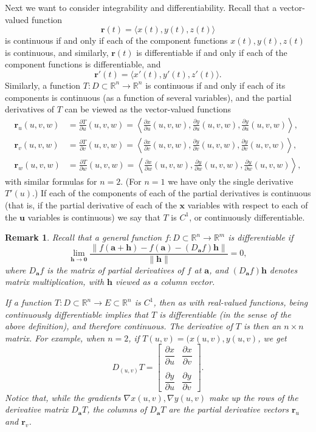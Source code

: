 \documentclass[12pt,letterpaper]{article}
\newtheorem{rem}[theorem]{Remark}
\newenvironment{remark}{\begin{rem}\rm}{\end{rem}}
\newcommand{\R}{\mathbb{R}}
\newcommand{\x}{\mathbf{x}}
\newcommand{\uu}{\mathbf{u}}
\newcommand{\h}{\mathbf{h}}
\newcommand{\aaa}{\mathbf{a}}
\renewcommand{\r}{\mathbf{r}}
\begin{document}
Next we want to consider integrability and differentiability. Recall that a vector-valued function
\[
\r(t) = \langle x(t),y(t),z(t)\rangle
\]
is continuous if and only if each of the component functions $x(t), y(t), z(t)$ is continuous, and similarly, $\r(t)$ is differentiable if and only if each of the component functions is differentiable, and 
\[
\r'(t) = \langle x'(t), y'(t), z'(t)\rangle.
\]
Similarly, a function $T:D\subset \R^n \to \R^n$ is continuous if and only if each of its components is continuous (as a function of several variables), and the partial derivatives of $T$ can be viewed as the vector-valued functions
\begin{align*}
\r_u(u,v,w) &= \frac{\partial T}{\partial u}(u,v,w) = \left<\frac{\partial x}{\partial u}(u,v,w),\frac{\partial y}{\partial u}(u,v,w),\frac{\partial y}{\partial u}(u,v,w)\right>,\\
\r_v(u,v,w) &= \frac{\partial T}{\partial v}(u,v,w) = \left<\frac{\partial x}{\partial v}(u,v,w),\frac{\partial y}{\partial v}(u,v,w),\frac{\partial y}{\partial v}(u,v,w)\right>,\\
\r_w(u,v,w) &= \frac{\partial T}{\partial w}(u,v,w) = \left<\frac{\partial x}{\partial w}(u,v,w),\frac{\partial y}{\partial w}(u,v,w),\frac{\partial y}{\partial w}(u,v,w)\right>,
\end{align*}
with similar formulas for $n=2$. (For $n=1$ we have only the single derivative $T'(u)$.) If each of the components of each of the partial derivatives is continuous (that is, if the partial derivative of each of the $\x$ variables with respect to each of the $\uu$ variables is continuous) we say that $T$ is $C^1$, or continuously differentiable.
\begin{remark}
Recall that a general function $f:D\subset \R^n\to\R^m$ is {\em differentiable} if
\[
\lim_{\h\to\mathbf{0}}\frac{\lVert f(\aaa+\h)-f(\aaa)-(D_\aaa f)\h\rVert}{\lVert\h\rVert}=0,
\]
where $D_\aaa f$ is the matrix of partial derivatives of $f$ at $\aaa$, and $(D_\aaa f)\h$ denotes matrix multiplication, with $\h$ viewed as a column vector. 

If a function $T:D\subset\R^n\to E\subset \R^n$ is $C^1$, then as with real-valued functions, being continuously differentiable implies that $T$ is differentiable (in the sense of the above definition), and therefore continuous. The derivative of $T$ is then an $n\times n$ matrix. For example, when $n=2$, if $T(u,v) = (x(u,v), y(u,v)$, we get
\[
D_{(u,v)}T = \begin{bmatrix}
\dfrac{\partial x}{\partial u}& \dfrac{\partial x}{\partial v}\\ & \\ \dfrac{\partial y}{\partial u}&\dfrac{\partial y}{\partial v}
\end{bmatrix}.
\]
Notice that, while the gradients $\nabla x(u,v), \nabla y(u,v)$ make up the rows of the derivative matrix $D_\aaa T$, the {\em columns} of $D_\aaa T$ are the partial derivative vectors $\r_u$ and $\r_v$.
\end{remark}
\end{document}
